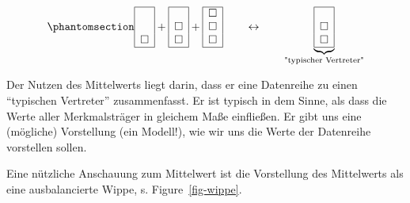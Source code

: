 \documentclass[
  letterpaper,
  DIV=11,
  numbers=noendperiod]{scrartcl}
\theoremstyle{definition}
\theoremstyle{definition}
\theoremstyle{definition}
\theoremstyle{remark}
\begin{document}
\begin{equation}\phantomsection\label{eq-mw2}{\begin{array}{|c|} \hline \\ \\ \square \\ \hline \end{array} + \begin{array}{|c|} \hline \\ \square \\ \square \\ \hline \end{array} + \begin{array}{|c|} \hline \square \\ \square \\ \square \\ \hline \end{array} \qquad \leftrightarrow  \qquad \underbrace{\begin{array}{|c|} \hline \\ \square \\ \square \\ \hline \end{array}}_{\text{"typischer Vertreter"}}}\end{equation}

\begin{tcolorbox}[enhanced jigsaw, breakable, toptitle=1mm, colback=white, leftrule=.75mm, colframe=quarto-callout-important-color-frame, colbacktitle=quarto-callout-important-color!10!white, title=\textcolor{quarto-callout-important-color}{\faExclamation}\hspace{0.5em}{Important}, toprule=.15mm, opacityback=0, arc=.35mm, coltitle=black, rightrule=.15mm, titlerule=0mm, bottomtitle=1mm, bottomrule=.15mm, left=2mm, opacitybacktitle=0.6]

Der Nutzen des Mittelwerts liegt darin, dass er eine Datenreihe zu einen
``typischen Vertreter'' zusammenfasst. Er ist typisch in dem Sinne, als
dass die Werte aller Merkmalsträger in gleichem Maße einfließen. Er gibt
uns eine (mögliche) Vorstellung (ein Modell!), wie wir uns die Werte der
Datenreihe vorstellen sollen.

\end{tcolorbox}

Eine nützliche Anschauung zum Mittelwert ist die Vorstellung des
Mittelwerts als eine ausbalancierte Wippe, s. Figure~\ref{fig-wippe}.
\end{document}
